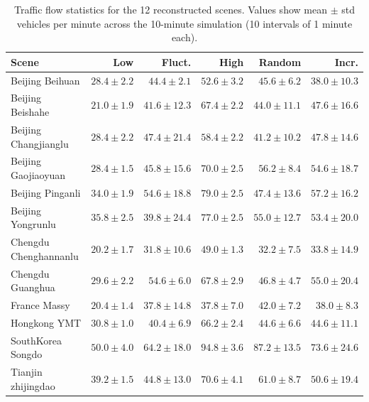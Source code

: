 \begin{table}[!htbp]
\centering
\caption{Traffic flow statistics for the 12 reconstructed scenes. Values show mean $\pm$ std vehicles per minute across the 10-minute simulation (10 intervals of 1 minute each).}
\label{tab:traffic_flow_settings}
\begin{tabular}{lrrrrr}
\toprule
\textbf{Scene} & \textbf{Low} & \textbf{Fluct.} & \textbf{High} & \textbf{Random} & \textbf{Incr.} \\
\midrule
Beijing Beihuan & $28.4 \pm 2.2$ & $44.4 \pm 2.1$ & $52.6 \pm 3.2$ & $45.6 \pm 6.2$ & $38.0 \pm 10.3$ \\
Beijing Beishahe & $21.0 \pm 1.9$ & $41.6 \pm 12.3$ & $67.4 \pm 2.2$ & $44.0 \pm 11.1$ & $47.6 \pm 16.6$ \\
Beijing Changjianglu & $28.4 \pm 2.2$ & $47.4 \pm 21.4$ & $58.4 \pm 2.2$ & $41.2 \pm 10.2$ & $47.8 \pm 14.6$ \\
Beijing Gaojiaoyuan & $28.4 \pm 1.5$ & $45.8 \pm 15.6$ & $70.0 \pm 2.5$ & $56.2 \pm 8.4$ & $54.6 \pm 18.7$ \\
Beijing Pinganli & $34.0 \pm 1.9$ & $54.6 \pm 18.8$ & $79.0 \pm 2.5$ & $47.4 \pm 13.6$ & $57.2 \pm 16.2$ \\
Beijing Yongrunlu & $35.8 \pm 2.5$ & $39.8 \pm 24.4$ & $77.0 \pm 2.5$ & $55.0 \pm 12.7$ & $53.4 \pm 20.0$ \\
Chengdu Chenghannanlu & $20.2 \pm 1.7$ & $31.8 \pm 10.6$ & $49.0 \pm 1.3$ & $32.2 \pm 7.5$ & $33.8 \pm 14.9$ \\
Chengdu Guanghua & $29.6 \pm 2.2$ & $54.6 \pm 6.0$ & $67.8 \pm 2.9$ & $46.8 \pm 4.7$ & $55.0 \pm 20.4$ \\
France Massy & $20.4 \pm 1.4$ & $37.8 \pm 14.8$ & $37.8 \pm 7.0$ & $42.0 \pm 7.2$ & $38.0 \pm 8.3$ \\
Hongkong YMT & $30.8 \pm 1.0$ & $40.4 \pm 6.9$ & $66.2 \pm 2.4$ & $44.6 \pm 6.6$ & $44.6 \pm 11.1$ \\
SouthKorea Songdo & $50.0 \pm 4.0$ & $64.2 \pm 18.0$ & $94.8 \pm 3.6$ & $87.2 \pm 13.5$ & $73.6 \pm 24.6$ \\
Tianjin zhijingdao & $39.2 \pm 1.5$ & $44.8 \pm 13.0$ & $70.6 \pm 4.1$ & $61.0 \pm 8.7$ & $50.6 \pm 19.4$ \\
\bottomrule
\end{tabular}
\end{table}